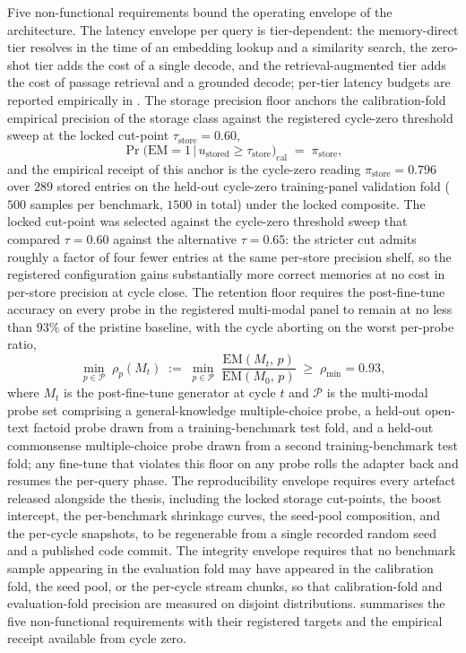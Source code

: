 Five non-functional requirements bound the operating envelope of the architecture. The latency envelope per query is tier-dependent: the memory-direct tier resolves in the time of an embedding lookup and a similarity search, the zero-shot tier adds the cost of a single decode, and the retrieval-augmented tier adds the cost of passage retrieval and a grounded decode; per-tier latency budgets are reported empirically in . The storage precision floor anchors the calibration-fold empirical precision of the storage class against the registered cycle-zero threshold sweep at the locked cut-point $\tau_{\text{store}} = 0.60$,
\begin{equation}
\Pr\!\big(\mathrm{EM} = 1 \,\big|\, u_{\text{stored}} \ge \tau_{\text{store}}\big)_{\text{cal}} \;=\; \pi_{\text{store}},
\label{eq:nfr-precision-floor}
\end{equation}
and the empirical receipt of this anchor is the cycle-zero reading $\pi_{\text{store}} = 0.796$ over $289$ stored entries on the held-out cycle-zero training-panel validation fold ($500$ samples per benchmark, $1500$ in total) under the locked composite. The locked cut-point was selected against the cycle-zero threshold sweep that compared $\tau = 0.60$ against the alternative $\tau = 0.65$: the stricter cut admits roughly a factor of four fewer entries at the same per-store precision shelf, so the registered configuration gains substantially more correct memories at no cost in per-store precision at cycle close. The retention floor requires the post-fine-tune accuracy on every probe in the registered multi-modal panel to remain at no less than $93\%$ of the pristine baseline, with the cycle aborting on the worst per-probe ratio,
\begin{equation}
\min_{p \in \mathcal{P}}\; \rho_{p}(M_{t}) \;:=\; \min_{p \in \mathcal{P}}\; \frac{\mathrm{EM}(M_{t},\,p)}{\mathrm{EM}(M_{0},\,p)} \;\ge\; \rho_{\min} = 0.93,
\label{eq:nfr-retention-floor}
\end{equation}
where $M_{t}$ is the post-fine-tune generator at cycle $t$ and $\mathcal{P}$ is the multi-modal probe set comprising a general-knowledge multiple-choice probe, a held-out open-text factoid probe drawn from a training-benchmark test fold, and a held-out commonsense multiple-choice probe drawn from a second training-benchmark test fold; any fine-tune that violates this floor on any probe rolls the adapter back and resumes the per-query phase. The reproducibility envelope requires every artefact released alongside the thesis, including the locked storage cut-points, the boost intercept, the per-benchmark shrinkage curves, the seed-pool composition, and the per-cycle snapshots, to be regenerable from a single recorded random seed and a published code commit. The integrity envelope requires that no benchmark sample appearing in the evaluation fold may have appeared in the calibration fold, the seed pool, or the per-cycle stream chunks, so that calibration-fold and evaluation-fold precision are measured on disjoint distributions.  summarises the five non-functional requirements with their registered targets and the empirical receipt available from cycle zero.

